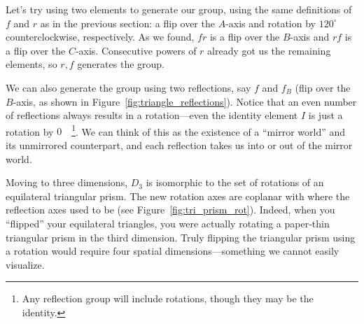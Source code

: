 \documentclass[../gatm.tex]{subfiles}
\begin{document}
Let's try using two elements to generate our group, using the same definitions of $f$ and $r$ as in the previous section: a flip over the $A$-axis and rotation by $120^{\circ}$ counterclockwise, respectively. As we found, $fr$ is a flip over the $B$-axis and $rf$ is a flip over the $C$-axis. Consecutive powers of $r$ already got us the remaining elements, so ${r,f}$ generates the group.

We can also generate the group using two reflections, say $f$ and $f_B$ (flip over the $B$-axis, as shown in Figure~\ref{fig:triangle_reflections}). Notice that an even number of reflections always results in a rotation---even the identity element $I$ is just a rotation by $0\quad$\footnote{Any reflection group will include rotations, though they may be the identity.}. We can think of this as the existence of a ``mirror world'' and its unmirrored counterpart, and each reflection takes us into or out of the mirror world.

Moving to three dimensions, $D_3$ is isomorphic to the set of rotations of an equilateral triangular prism. The new rotation axes are coplanar with where the reflection axes used to be (see Figure~\ref{fig:tri_prism_rot}). Indeed, when you ``flipped'' your equilateral triangles, you were actually rotating a paper-thin triangular prism in the third dimension. Truly flipping the triangular prism using a rotation would require four spatial dimensions---something we cannot easily visualize.
\end{document}
